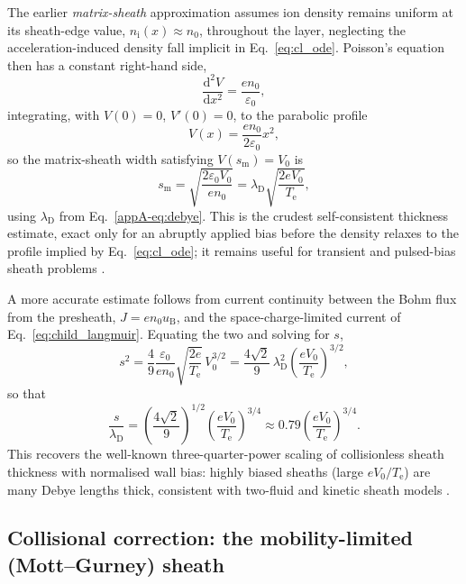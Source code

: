 The earlier \emph{matrix-sheath} approximation assumes ion density remains uniform at its sheath-edge value, $n_{\mathrm{i}}(x) \approx n_{0}$, throughout the layer, neglecting the acceleration-induced density fall implicit in Eq.~\eqref{eq:cl_ode}. Poisson's equation then has a constant right-hand side,
\begin{equation}
\frac{\mathrm{d}^{2}V}{\mathrm{d}x^{2}} = \frac{en_{0}}{\varepsilon_{0}},
\end{equation}
integrating, with $V(0)=0$, $V'(0)=0$, to the parabolic profile
\begin{equation}
V(x) = \frac{en_{0}}{2\varepsilon_{0}}x^{2},
\end{equation}
so the matrix-sheath width satisfying $V(s_{\mathrm{m}})=V_{0}$ is
\begin{equation}
s_{\mathrm{m}} = \sqrt{\frac{2\varepsilon_{0}V_{0}}{en_{0}}} = \lambda_{\mathrm{D}}\sqrt{\frac{2eV_{0}}{T_{\mathrm{e}}}},
\label{eq:matrix_sheath}
\end{equation}
using $\lambda_{\mathrm{D}}$ from Eq.~\eqref{appA-eq:debye}. This is the crudest self-consistent thickness estimate, exact only for an abruptly applied bias before the density relaxes to the profile implied by Eq.~\eqref{eq:cl_ode}; it remains useful for transient and pulsed-bias sheath problems \cite{ref0023}.

A more accurate estimate follows from current continuity between the Bohm flux from the presheath, $J = en_{0}u_{\mathrm{B}}$, and the space-charge-limited current of Eq.~\eqref{eq:child_langmuir}. Equating the two and solving for $s$,
\begin{equation}
s^{2} = \frac{4}{9}\frac{\varepsilon_{0}}{en_{0}}\sqrt{\frac{2e}{T_{\mathrm{e}}}}\,V_{0}^{3/2}
= \frac{4\sqrt{2}}{9}\,\lambda_{\mathrm{D}}^{2}\left(\frac{eV_{0}}{T_{\mathrm{e}}}\right)^{3/2},
\end{equation}
so that
\begin{equation}
\boxed{\frac{s}{\lambda_{\mathrm{D}}} = \left(\frac{4\sqrt{2}}{9}\right)^{1/2}\left(\frac{eV_{0}}{T_{\mathrm{e}}}\right)^{3/4} \approx 0.79\left(\frac{eV_{0}}{T_{\mathrm{e}}}\right)^{3/4}}.
\label{eq:cl_scaling}
\end{equation}
This recovers the well-known three-quarter-power scaling of collisionless sheath thickness with normalised wall bias: highly biased sheaths (large $eV_{0}/T_{\mathrm{e}}$) are many Debye lengths thick, consistent with two-fluid and kinetic sheath models \cite{ref0023}.

\subsection{Collisional correction: the mobility-limited (Mott--Gurney) sheath}

